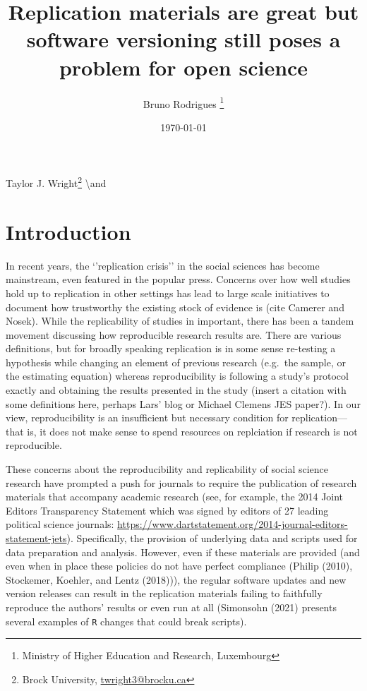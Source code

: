 \documentclass[
  letterpaper,
  DIV=11,
  numbers=noendperiod]{scrartcl}
\author{}
\date{}
\begin{document}
\ifdefined\Shaded\renewenvironment{Shaded}{\begin{tcolorbox}[sharp corners, frame hidden, interior hidden, borderline west={3pt}{0pt}{shadecolor}, boxrule=0pt, enhanced, breakable]}{\end{tcolorbox}}\fi

\date{\today}
\title{\textbf{Replication materials are great but software versioning still poses a problem for open science}}

Taylor J.
Wright\thanks{Brock University, \href{mailto:twright3@brocku.ca}{twright3@brocku.ca}}
\textbackslash and

\author{Bruno Rodrigues \thanks{Ministry of Higher Education and Research, Luxembourg}
}

\maketitle

\newpage

\hypertarget{introduction}{%
\section{Introduction}\label{introduction}}

In recent years, the `'replication crisis'' in the social sciences has
become mainstream, even featured in the popular press. Concerns over how
well studies hold up to replication in other settings has lead to large
scale initiatives to document how trustworthy the existing stock of
evidence is (cite Camerer and Nosek). While the replicability of studies
in important, there has been a tandem movement discussing how
reproducible research results are. There are various definitions, but
for broadly speaking replication is in some sense re-testing a
hypothesis while changing an element of previous research (e.g.~the
sample, or the estimating equation) whereas reproducibility is following
a study's protocol exactly and obtaining the results presented in the
study (insert a citation with some definitions here, perhaps Lars' blog
or Michael Clemens JES paper?). In our view, reproducibility is an
insufficient but necessary condition for replication---that is, it does
not make sense to spend resources on replciation if research is not
reproducible.

These concerns about the reproducibility and replicability of social
science research have prompted a push for journals to require the
publication of research materials that accompany academic research (see,
for example, the 2014 Joint Editors Transparency Statement which was
signed by editors of 27 leading political science journals:
\url{https://www.dartstatement.org/2014-journal-editors-statement-jets}).
Specifically, the provision of underlying data and scripts used for data
preparation and analysis. However, even if these materials are provided
(and even when in place these policies do not have perfect compliance
(Philip (2010), Stockemer, Koehler, and Lentz (2018))), the regular
software updates and new version releases can result in the replication
materials failing to faithfully reproduce the authors' results or even
run at all (Simonsohn (2021) presents several examples of \texttt{R}
changes that could break scripts).
\end{document}

